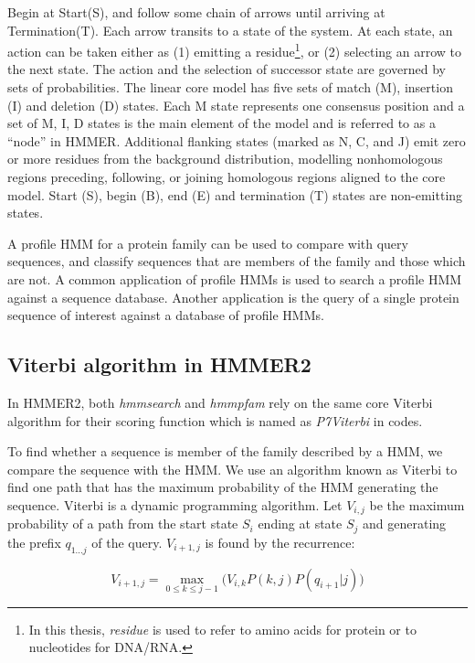 Begin at Start(S), and follow some chain of arrows until arriving at Termination(T). Each arrow transits to a state of the system. 
At each state, an action can be taken either as (1) emitting a residue\footnote{In this thesis, \emph{residue} is used to refer to amino acids for protein or to nucleotides for DNA/RNA.}, or (2) selecting an arrow to the next state. The action and the selection of successor state are governed by sets of probabilities\citep{IntroBio}.
The linear core model has five sets of match (M), insertion (I) and deletion (D) states. Each M state represents one consensus position and a set of M, I, D states is the main element of the model and is referred to as a “node” in HMMER. Additional flanking states (marked as N, C, and J) emit zero or more residues from the background distribution, modelling nonhomologous regions preceding, following, or joining homologous regions aligned to the core model. Start (S), begin (B), end (E) and termination (T) states are non-emitting states.


A profile HMM for a protein family can be used to compare with query sequences, and classify sequences that are members of the family and those which are not\citep{ProteinBio}. 
A common application of profile HMMs is used to search a profile HMM against a sequence database. Another application is the query of a single protein sequence of interest against a database of profile HMMs.

\subsection{Viterbi algorithm in HMMER2}

\label{ViterbiSub}

In HMMER2, both \emph{hmmsearch} and \emph{hmmpfam} rely on the same core Viterbi algorithm for their scoring function which is named as \emph{P7Viterbi} in codes.

To find whether a sequence is member of the family described by a HMM, we compare the sequence with the HMM. We use an algorithm known as Viterbi to find one path that has the maximum probability of the HMM generating the sequence. Viterbi is a dynamic programming algorithm. Let $V_{i,j}$ be the maximum probability of a path from the start state $S_i$ ending at state $S_j$ and generating the prefix $q_{1...j}$ of the query. $V_{i+1,j}$ is found by the recurrence:

\begin{equation*}
   \displaystyle V_{i+1,j} = \max_{0 \leqslant k \leqslant j-1} \big ( V_{i,k} P(k,j)P(q_{i+1} |j) \big )
\end{equation*}

